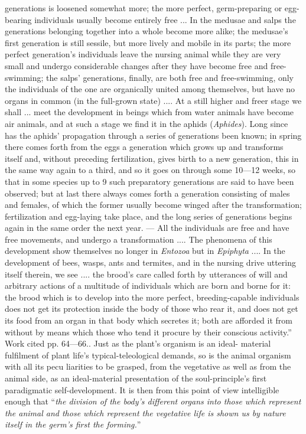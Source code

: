 \documentclass[12pt,a4paper]{book}
\begin{document}
{generations is loosened somewhat more; the more perfect, germ-preparing or egg-bearing
individuals usually become entirely free ... In the medusae and salps the generations
belonging together into a whole become more alike; the medusae's first generation is
still sessile, but more lively and mobile in its parts; the more perfect generation's
individuals leave the nursing animal while they are very small and undergo
considerable changes after they have become free and free-swimming; the salps'
generations, finally, are both free and free-swimming, only the individuals of the one
are organically united among themselves, but have no organs in common (in the
full-grown state) .... At a still higher and freer stage we shall ... meet the
development in beings which from water animals have become air animals, and at such a
stage we find it in the aphids (\textit{Aphides}). Long since has the aphids'
propagation through a series of generations been known; in spring there comes forth
from the eggs a generation which grows up and transforms itself and, without preceding
fertilization, gives birth to a new generation, this in the same way again to a third,
and so it goes on through some 10---12 weeks, so that in some species up to 9 such
preparatory generations are said to have been observed; but at last there always comes
forth a generation consisting of males and females, of which the former usually become
winged after the transformation; fertilization and egg-laying take place, and the long
series of generations begins again in the same order the next year. --- All the
individuals are free and have free movements, and undergo a transformation .... The
phenomena of this development show themselves no longer in \textit{Entozoa} but in
\textit{Epiphyta} .... In the development of bees, wasps, ants and termites, and in
the nursing drive uttering itself therein, we see .... the brood's care called forth
by utterances of will and arbitrary actions of a multitude of individuals which are
born and borne for it: the brood which is to develop into the more perfect,
breeding-capable individuals does not get its protection inside the body of those who
rear it, and does not get its food from an organ in that body which secretes it; both
are afforded it from without by means which those who tend it procure by their
conscious activity.'' Work cited pp. 64---66.}. Just as the plant's organism is an
ideal-%
material fulfilment of plant life's typical-teleological demands, so is the animal
organism with all its pecu%
liarities to be grasped, from the vegetative as well as from the animal side, as an
ideal-material presentation of the soul-principle's first paradigmatic
self-development. It is then from this point of view intelligible enough that
``\emph{the division of the body's different organs into those which represent the
animal and those which represent the vegetative life is shown us by nature itself in
the germ's first the forming.}''
\end{document}

